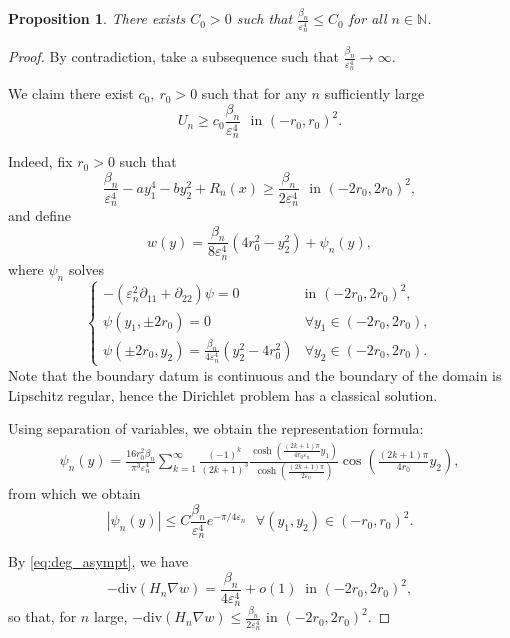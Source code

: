 \documentclass[10pt,a4paper]{article}
\newcommand{\NN}{\mathbb{N}}
\newcommand{\divg}{\mathrm{div}}
\newcommand{\faskip}{\hspace{8pt}}
\newtheorem{prop}[thm]{Proposition}
\numberwithin{equation}{section}
\begin{document}
\begin{prop}
	\label{prop:deg_bound_q}
	There exists $C_0> 0$ such that $ \frac{\beta_{n}}{\varepsilon_n^{4}} \leq C_0 $ for all $n \in \NN$.
\end{prop}
\begin{proof}
	By contradiction, take a subsequence such that $\frac{\beta_{n}}{\varepsilon_n^{4}} \rightarrow \infty$.

	We claim there exist $c_0, ~r_0 > 0$ such that for any $n$ sufficiently large	
	\[
		U_{n} \geq c_0 \frac{\beta_{n}}{\varepsilon_n^{4}}  \faskip \text{in } (-r_0, r_0)^{2}.
	\]

	Indeed, fix $r_0 > 0$ such that 
	\[
		\frac{\beta_{n}}{\varepsilon_n^{4}} - a y_1^{4} - b y_2^{2} + R_{n}(x) \geq \frac{\beta_{n}}{2\varepsilon_n^{4}} \faskip \text{in } (-2r_0, 2r_0)^{2},
	\]
	and define
	\[w(y) = \frac{\beta_{n}}{8\varepsilon_n^{4}}(4 r_0^{2} - y_2^{2}) + \psi_{n}(y),\]
	where $\psi_{n}$ solves
	\[
		\begin{cases}
			-(\varepsilon_n^{2} \partial_{11} + \partial_{22}) \psi = 0 & \text{in }(-2r_0, 2r_0)^2, \\
			\psi(y_1, \pm 2r_0) = 0 & \forall y_1 \in (-2r_0, 2r_0), \\
			\psi(\pm 2 r_0, y_2) = \frac{\beta_{n}}{4\varepsilon_n^{4}}(y_2^{2} - 4 r_0^{2}) & \forall y_2 \in (-2r_0, 2r_0).  
		\end{cases}
	\]
	Note that the boundary datum is continuous and the boundary of the domain is Lipschitz regular, hence the Dirichlet problem has a classical solution.

	Using separation of variables, we obtain the representation formula:
\begin{align*}
	\psi_{n}(y) = \frac{16r_0^{2}\beta_{n}}{\pi^{3}\varepsilon_n^{4}}\sum_{k=1}^{\infty} \frac{(-1)^{k}}{(2k+1)^{3} } \frac{\cosh\left(\frac{(2k+1)\pi}{4r_0\varepsilon_n}y_1\right)}{\cosh\left(\frac{(2k+1)\pi}{2\varepsilon_n}\right)}	\cos \left( \frac{(2k+1)\pi}{4r_0} y_2 \right),
\end{align*}
from which we obtain 
\begin{equation}
	\label{eq:bound_psi}
	|\psi_{n}(y)| \leq C \frac{\beta_{n}}{\varepsilon_n^{4}}e^{-\pi/4\varepsilon_n} \faskip \forall (y_1, y_2) \in (-r_0, r_0)^{2}.
\end{equation}

By \eqref{eq:deg_asympt}, we have 
\[-\divg(H_n\nabla w) = \frac{\beta_n}{4\varepsilon_n^{4}} + o(1)  ~\text{ in } (-2r_0,2r_0)^{2},\]
so that, for $n$ large, $-\divg(H_n \nabla w) \leq \frac{\beta_n}{2 \varepsilon_n^{4}}$ in $ (-2r_0, 2r_0)^{2} $.


\end{proof}
\end{document}
